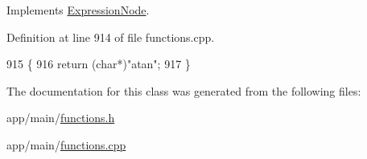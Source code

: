 Implements \hyperlink{classExpressionNode_a42a5e9562b0f645a19dcc83f698069b5}{Expression\+Node}.



Definition at line 914 of file functions.\+cpp.


\begin{DoxyCode}
915 \{
916     \textcolor{keywordflow}{return} (\textcolor{keywordtype}{char}*)\textcolor{stringliteral}{"atan"};
917 \}
\end{DoxyCode}


The documentation for this class was generated from the following files\+:\begin{DoxyCompactItemize}
\item 
app/main/\hyperlink{functions_8h}{functions.\+h}\item 
app/main/\hyperlink{functions_8cpp}{functions.\+cpp}\end{DoxyCompactItemize}
